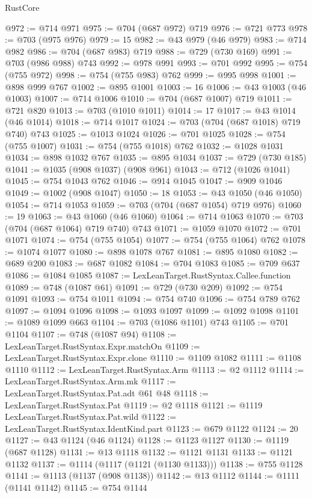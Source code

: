 \begin{lexlean}{RustCore}
\begin{coremodule}
@972 := @714 @971
@975 := @704 (@687 @972) @719
@976 := @721 @773
@978 := @703 (@975 @976)
@979 := 15
@982 := @43 @979 (@46 @979)
@983 := @714 @982
@986 := @704 (@687 @983) @719
@988 := @729 (@730 @169)
@991 := @703 (@986 @988) @743
@992 := @978 @991
@993 := @701 @992
@995 := @754 (@755 @972)
@998 := @754 (@755 @983) @762
@999 := @995 @998
@1001 := @898 @999 @767
@1002 := @895 @1001
@1003 := 16
@1006 := @43 @1003 (@46 @1003)
@1007 := @714 @1006
@1010 := @704 (@687 @1007) @719
@1011 := @721 @820
@1013 := @703 (@1010 @1011)
@1014 := 17
@1017 := @43 @1014 (@46 @1014)
@1018 := @714 @1017
@1024 := @703 (@704 (@687 @1018) @719 @740) @743
@1025 := @1013 @1024
@1026 := @701 @1025
@1028 := @754 (@755 @1007)
@1031 := @754 (@755 @1018) @762
@1032 := @1028 @1031
@1034 := @898 @1032 @767
@1035 := @895 @1034
@1037 := @729 (@730 @185)
@1041 := @1035 (@908 @1037) (@908 @961)
@1043 := @712 (@1026 @1041)
@1045 := @754 @1043 @762
@1046 := @914 @1045
@1047 := @909 @1046
@1049 := @1002 (@908 @1047)
@1050 := 18
@1053 := @43 @1050 (@46 @1050)
@1054 := @714 @1053
@1059 := @703 (@704 (@687 @1054) @719 @976)
@1060 := 19
@1063 := @43 @1060 (@46 @1060)
@1064 := @714 @1063
@1070 := @703 (@704 (@687 @1064) @719 @740) @743
@1071 := @1059 @1070
@1072 := @701 @1071
@1074 := @754 (@755 @1054)
@1077 := @754 (@755 @1064) @762
@1078 := @1074 @1077
@1080 := @898 @1078 @767
@1081 := @895 @1080
@1082 := @689 @200
@1083 := @687 @1082
@1084 := @704 @1083
@1085 := @709 @637
@1086 := @1084 @1085
@1087 := LexLeanTarget.RustSyntax.Callee.function
@1089 := @748 (@1087 @61)
@1091 := @729 (@730 @209)
@1092 := @754 @1091
@1093 := @754 @1011
@1094 := @754 @740
@1096 := @754 @789 @762
@1097 := @1094 @1096
@1098 := @1093 @1097
@1099 := @1092 @1098
@1101 := @1089 @1099 @663
@1104 := @703 (@1086 @1101) @743
@1105 := @701 @1104
@1107 := @748 (@1087 @94)
@1108 := LexLeanTarget.RustSyntax.Expr.matchOn
@1109 := LexLeanTarget.RustSyntax.Expr.clone
@1110 := @1109 @1082
@1111 := @1108 @1110
@1112 := LexLeanTarget.RustSyntax.Arm
@1113 := @2 @1112
@1114 := LexLeanTarget.RustSyntax.Arm.mk
@1117 := LexLeanTarget.RustSyntax.Pat.adt @61 @48
@1118 := LexLeanTarget.RustSyntax.Pat
@1119 := @2 @1118
@1121 := @1119 LexLeanTarget.RustSyntax.Pat.wild
@1122 := LexLeanTarget.RustSyntax.IdentKind.part
@1123 := @679 @1122
@1124 := 20
@1127 := @43 @1124 (@46 @1124)
@1128 := @1123 @1127
@1130 := @1119 (@687 @1128)
@1131 := @13 @1118
@1132 := @1121 @1131
@1133 := @1121 @1132
@1137 := @1114 (@1117 (@1121 (@1130 @1133)))
@1138 := @755 @1128
@1141 := @1113 (@1137 (@908 @1138))
@1142 := @13 @1112
@1144 := @1111 (@1141 @1142)
@1145 := @754 @1144

\end{coremodule}
\end{lexlean}
